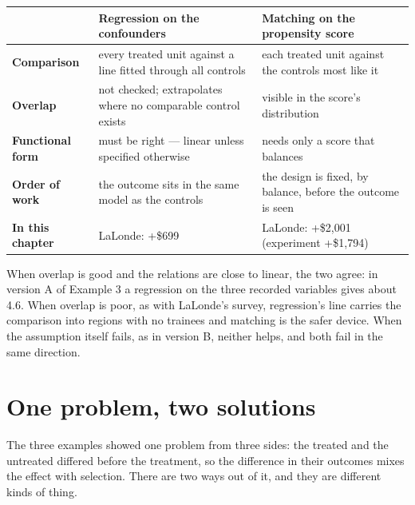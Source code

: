 \documentclass[
  letterpaper,
  10pt,
  twoside,
  openright,
  numbers=noenddot,
  chapterprefix=true]{scrbook}
\begin{document}
\begin{longtable}[]{@{}
  >{\raggedright\arraybackslash}p{}
  >{\raggedright\arraybackslash}p{}
  >{\raggedright\arraybackslash}p{}@{}}
\toprule\noalign{}
\begin{minipage}[b]{\linewidth}\raggedright
\end{minipage} & \begin{minipage}[b]{\linewidth}\raggedright
Regression on the confounders
\end{minipage} & \begin{minipage}[b]{\linewidth}\raggedright
Matching on the propensity score
\end{minipage} \\
\midrule\noalign{}
\endhead
\bottomrule\noalign{}
\endlastfoot
\textbf{Comparison} & every treated unit against a line fitted through
all controls & each treated unit against the controls most like it \\
\textbf{Overlap} & not checked; extrapolates where no comparable control
exists & visible in the score's distribution \\
\textbf{Functional form} & must be right --- linear unless specified
otherwise & needs only a score that balances \\
\textbf{Order of work} & the outcome sits in the same model as the
controls & the design is fixed, by balance, before the outcome is
seen \\
\textbf{In this chapter} & LaLonde: +\$699 & LaLonde: +\$2,001
(experiment +\$1,794) \\
\end{longtable}

When overlap is good and the relations are close to linear, the two
agree: in version A of Example 3 a regression on the three recorded
variables gives about 4.6. When overlap is poor, as with LaLonde's
survey, regression's line carries the comparison into regions with no
trainees and matching is the safer device. When the assumption itself
fails, as in version B, neither helps, and both fail in the same
direction.

\section{One problem, two solutions}\label{one-problem-two-solutions}

The three examples showed one problem from three sides: the treated and
the untreated differed before the treatment, so the difference in their
outcomes mixes the effect with selection. There are two ways out of it,
and they are different kinds of thing.
\end{document}
